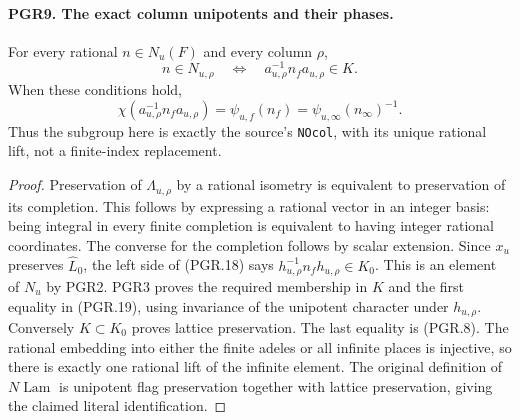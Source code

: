 \paragraph{PGR9. The exact column unipotents and their phases.}
\label{claim:PGR9}
For every rational \(n\in N_u(F)\) and every column \(\rho\),
\[
 n\in N_{u,\rho}\quad\Longleftrightarrow\quad
             a_{u,\rho}^{-1}n_fa_{u,\rho}\in K.
\tag{PGR.18}
\]
When these conditions hold,
\[
 \chi(a_{u,\rho}^{-1}n_fa_{u,\rho})=\psi_{u,f}(n_f)
                              =\psi_{u,\infty}(n_\infty)^{-1}.
\tag{PGR.19}
\]
Thus the subgroup here is exactly the source's \texttt{NOcol},
with its unique rational lift, not a finite-index replacement.
\begin{proof}
Preservation of \(\Lambda_{u,\rho}\) by a rational isometry is
equivalent to preservation of its completion.  This follows by
expressing a rational vector in an integer basis: being integral
in every finite completion is equivalent to having integer rational
coordinates.  The converse for the completion follows by scalar
extension.  Since \(x_u\) preserves \(\widehat L_0\), the
left side of (PGR.18) says
\(h_{u,\rho}^{-1}n_fh_{u,\rho}\in K_0\).
This is an element of \(N_u\) by PGR2.  PGR3 proves the required
membership in \(K\) and the first equality in (PGR.19), using
invariance of the unipotent character under \(h_{u,\rho}\).
Conversely \(K\subset K_0\) proves lattice preservation.
The last equality is (PGR.8).  The rational embedding into either
the finite adeles or all infinite places is injective, so there is
exactly one rational lift of the infinite element.  The original
definition of \(N\!\operatorname{Lam}\) is unipotent flag
preservation together with lattice preservation, giving the claimed
literal identification.
\end{proof}

